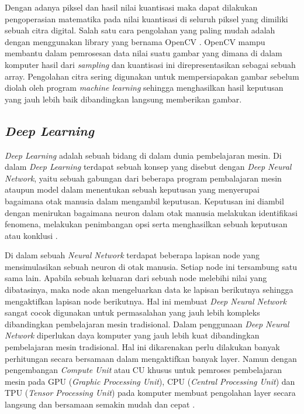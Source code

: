 Dengan adanya piksel dan hasil nilai kuantisasi maka dapat dilakukan pengoperasian matematika pada nilai kuantisasi di seluruh piksel yang dimiliki sebuah citra digital. Salah satu cara pengolahan yang paling mudah adalah dengan menggunakan library yang bernama OpenCV \cite{KusumantoPengolahanCitra}. OpenCV mampu membantu dalam pemrosesan data nilai suatu gambar yang dimana di dalam komputer hasil dari \emph{sampling} dan kuantisasi ini direpresentasikan sebagai sebuah array. Pengolahan citra sering digunakan untuk mempersiapakan gambar sebelum diolah oleh program \emph{machine learning} sehingga menghasilkan hasil keputusan yang jauh lebih baik dibandingkan langsung memberikan gambar.

\subsection{\emph{Deep Learning}}

\emph{Deep Learning} adalah sebuah bidang di dalam dunia pembelajaran mesin. Di dalam \emph{Deep Learning} terdapat sebuah konsep yang disebut dengan \emph{Deep Neural Network}, yaitu sebuah gabungan dari beberapa program pembalajaran mesin ataupun model dalam menentukan sebuah keputusan yang menyerupai bagaimana otak manusia dalam mengambil keputusan. Keputusan ini diambil dengan menirukan bagaimana neuron dalam otak manusia melakukan identifikasi fenomena, melakukan penimbangan opsi serta menghasilkan sebuah keputusan atau konklusi \cite{IBMDeepLearning}. 

Di dalam sebuah \emph{Neural Network} terdapat beberapa lapisan node yang mensimulasikan sebuah neuron di otak manusia. Setiap node ini tersambung satu sama lain. Apabila sebuah keluaran dari sebuah node melebihi nilai yang dibatasinya, maka node akan mengeluarkan data ke lapisan berikutnya sehingga mengaktifkan lapisan node berikutnya. Hal ini membuat \emph{Deep Neural Network} sangat cocok digunakan untuk permasalahan yang jauh lebih kompleks dibandingkan pembelajaran mesin tradisional. Dalam penggunaan \emph{Deep Neural Network} diperlukan daya komputer yang jauh lebih kuat dibandingkan pembelajaran mesin tradisional. Hal ini dikarenakan perlu dilakukan banyak perhitungan secara bersamaan dalam mengaktifkan banyak layer. Namun dengan pengembangan \emph{Compute Unit} atau CU khusus untuk pemroses pembelajaran mesin pada GPU (\emph{Graphic Processing Unit}), CPU (\emph{Central Processing Unit}) dan TPU (\emph{Tensor Processing Unit}) pada komputer membuat pengolahan layer secara langsung dan bersamaan semakin mudah dan cepat \cite{Goodfellow-et-al-2016}.


